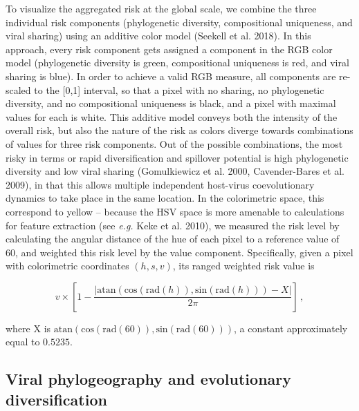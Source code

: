 \documentclass[10pt,oneside]{article}
\begin{document}
To visualize the aggregated risk at the global scale, we combine the
three individual risk components (phylogenetic diversity, compositional
uniqueness, and viral sharing) using an additive color model (Seekell et
al. 2018). In this approach, every risk component gets assigned a
component in the RGB color model (phylogenetic diversity is green,
compositional uniqueness is red, and viral sharing is blue). In order to
achieve a valid RGB measure, all components are re-scaled to the
{[}0,1{]} interval, so that a pixel with no sharing, no phylogenetic
diversity, and no compositional uniqueness is black, and a pixel with
maximal values for each is white. This additive model conveys both the
intensity of the overall risk, but also the nature of the risk as colors
diverge towards combinations of values for three risk components. Out of
the possible combinations, the most risky in terms or rapid
diversification and spillover potential is high phylogenetic diversity
and low viral sharing (Gomulkiewicz et al. 2000, Cavender-Bares et al.
2009), in that this allows multiple independent host-virus
coevolutionary dynamics to take place in the same location. In the
colorimetric space, this correspond to yellow -- because the HSV space
is more amenable to calculations for feature extraction (see \emph{e.g.}
Keke et al. 2010), we measured the risk level by calculating the angular
distance of the hue of each pixel to a reference value of 60, and
weighted this risk level by the value component. Specifically, given a
pixel with colorimetric coordinates \((h,s,v)\), its ranged weighted
risk value is

\[
v\times\left[1-\frac{\left|\text{atan}\left(\text{cos}(\text{rad}(h)), \text{sin}(\text{rad}(h))\right) - X\right|}{2\pi}\right]\,,
\]

where X is
\(\text{atan}\left(\text{cos}(\text{rad}(60)), \text{sin}(\text{rad}(60))\right)\),
a constant approximately equal to \(0.5235\).

\hypertarget{viral-phylogeography-and-evolutionary-diversification}{%
\subsection{Viral phylogeography and evolutionary
diversification}\label{viral-phylogeography-and-evolutionary-diversification}}
\end{document}
